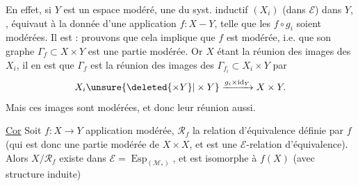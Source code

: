 En effet, si $Y$ est un espace modéré, une   du syst. inductif $(X_i)$ (dans $\mathcal E$) dans $Y$, , équivaut à la donnée d'une application $f:X\mathbin{-}Y$, telle que les $f\circ g_i$ soient modérées. Il est  : prouvons que cela implique que $f$ est modérée, i.e. que son graphe $\Gamma_f\subset X\times Y$ est une partie modérée. Or $X$ étant la réunion des images des $X_i$, il en est que $\Gamma_f$ est la réunion des images des $\Gamma_{f_i}\subset X_i\times Y$ par
\[
 X_i\unsure{\deleted{\times Y}|\times Y}\xrightarrow{g_i\times\operatorname{id}_Y}X\times Y.
\]
Mais ces images sont modérées, et donc leur réunion aussi.

\uline{Cor} Soit $f:X\longrightarrow Y$ application modérée, $\mathcal R_f$ la relation d'équivalence définie par $f$ (qui est donc une partie modérée de $X\times X$, et est une $\mathcal E$-relation d'équivalence). Alors $X/\mathcal R_f$ existe dans $\mathcal E=\operatorname{Esp}_{(\mathcal M_*)}$, et est  isomorphe à $f(X)$ (avec structure induite)

